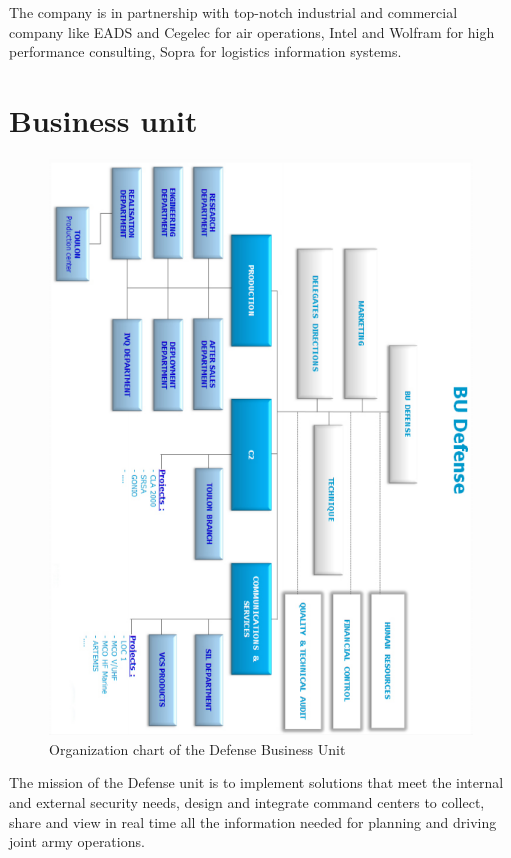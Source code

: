\documentclass{koala-en}
\begin{document}
The company is in partnership with top-notch industrial and commercial company like EADS and Cegelec for air operations, Intel and Wolfram for high performance consulting, Sopra for logistics information systems.

\thispagestyle{fancy}
\newpage

\section{Business unit}

\begin{figure}[!ht]
  \center
  \includegraphics[width=15cm]{ochart.png}
  \caption{Organization chart of the Defense Business Unit}
\end{figure}

The mission of the Defense unit is to implement solutions that meet the internal and external security needs, design and integrate command centers to collect, share and view in real time all the information needed for planning and driving joint army operations.
\end{document}
